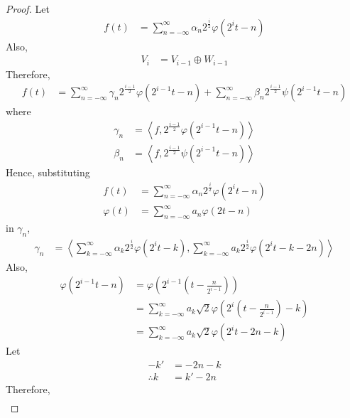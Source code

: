 \documentclass[titlepage, fleqn, a4paper, 12pt, twoside]{article}
\theoremstyle{definition}
\theoremstyle{theorem}
\begin{document}
\begin{proof}
	Let
	\begin{align*}
		f(t) &= \sum\limits_{n = -\infty}^{\infty} \alpha_n 2^{\frac{i}{2}} \varphi\left( 2^i t - n \right)
	\end{align*}
	Also,
	\begin{align*}
		V_i &= V_{i - 1} \oplus W_{i - 1}
	\end{align*}
	Therefore,
	\begin{align*}
		f(t) &= \sum\limits_{n = -\infty}^{\infty} \gamma_n 2^{\frac{i - 1}{2}} \varphi\left( 2^{i - 1} t - n \right) + \sum\limits_{n = -\infty}^{\infty} \beta_n 2^{\frac{i - 1}{2}} \psi\left( 2^{i - 1} t - n \right)
	\end{align*}
	where
	\begin{align*}
		\gamma_n &= \left\langle f , 2^{\frac{i - 1}{2}} \varphi\left( 2^{i - 1} t - n \right) \right\rangle\\
		\beta_n &= \left\langle f , 2^{\frac{i - 1}{2}} \psi\left( 2^{i - 1} t - n \right) \right\rangle
	\end{align*}
	Hence, substituting
	\begin{align*}
		f(t) &= \sum\limits_{n = -\infty}^{\infty} \alpha_n 2^{\frac{i}{2}} \varphi\left( 2^i t - n \right)\\
		\varphi(t) &= \sum\limits_{n = -\infty}^{\infty} a_n \varphi(2 t - n)
	\end{align*}
	in $\gamma_n$,
	\begin{align*}
		\gamma_n &= \left\langle \sum\limits_{k = -\infty}^{\infty} \alpha_k 2^{\frac{i}{2}} \varphi\left( 2^i t - k \right) , \sum\limits_{k = -\infty}^{\infty} a_k 2^{\frac{i}{2}} \varphi\left( 2^i t - k - 2 n \right) \right\rangle
	\end{align*}
	Also,
	\begin{align*}
		\varphi\left( 2^{i - 1} t - n \right) &= \varphi\left( 2^{i - 1} \left( t - \frac{n}{2^{i - 1}} \right) \right)\\
		&= \sum\limits_{k = -\infty}^{\infty} a_k \sqrt{2} \varphi\left( 2^i \left( t - \frac{n}{2^{i - 1}} \right) - k \right)\\
		&= \sum\limits_{k = -\infty}^{\infty} a_k \sqrt{2} \varphi\left( 2^i t - 2 n - k \right)
	\end{align*}
	Let
	\begin{align*}
		-k' &= -2 n - k\\
		\therefore k &= k' - 2 n
	\end{align*}
	Therefore,
	\begin{align*}

\end{align*}
\end{proof}
\end{document}
